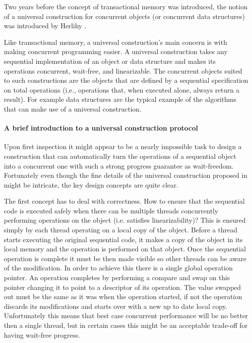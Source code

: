 Two years before the concept of transactional memory 
was introduced, the notion of a universal construction for concurrent objects (or 
concurrent data  structures) was introduced by Herlihy \cite{H91}.

Like transactional memory, a universal construction's main concern is
with making concurrent programming easier.
A universal construction takes any sequential implementation
of an object or data structure and makes its operations concurrent, wait-free,
and linearizable.
The concurrent objects suited to such   constructions are 
the objects that are  defined by a sequential specification
on total operations (i.e., operations that, when executed alone, 
always return a result).
For example data structures are the typical example
of the algorithms that can make use of a universal construction.

%
%


\paragraph{A brief introduction to a universal construction protocol}
Upon first inspection it might appear to be a nearly impossible task to design
a construction that can automatically turn the operations of a sequential
object into a concurrent one with such a strong progress guarantee as wait-freedom.
Fortunately even though the fine details of the universal construction proposed
in \cite{H91} might be intricate, the key design concepts are quite clear.

The first concept has to deal with correctness.
How to ensure that the sequential code is executed safely when there
can be multiple threads concurrently performing operations on the object
(i.e. satisfies linearizability)?
This is ensured simply by each thread operating on a local copy of the object.
Before a thread starts executing the original sequential code, it makes a copy
of the object in its local memory and the operation is performed on that object.
Once the sequential operation is complete it must be then made visible so other
threads can be aware of the modification.
In order to achieve this there is a single global operation pointer.
An operation completes by performing a compare and swap on this pointer
changing it to point to a descriptor of its operation.
The value swapped out must be the same as it was when the operation started,
if not the operation discards its modifications and starts over with a
new up to date local copy.
Unfortunately this means that best case concurrent performance will be no better
then a single thread, but in certain cases this might be an acceptable
trade-off for having wait-free progress.

